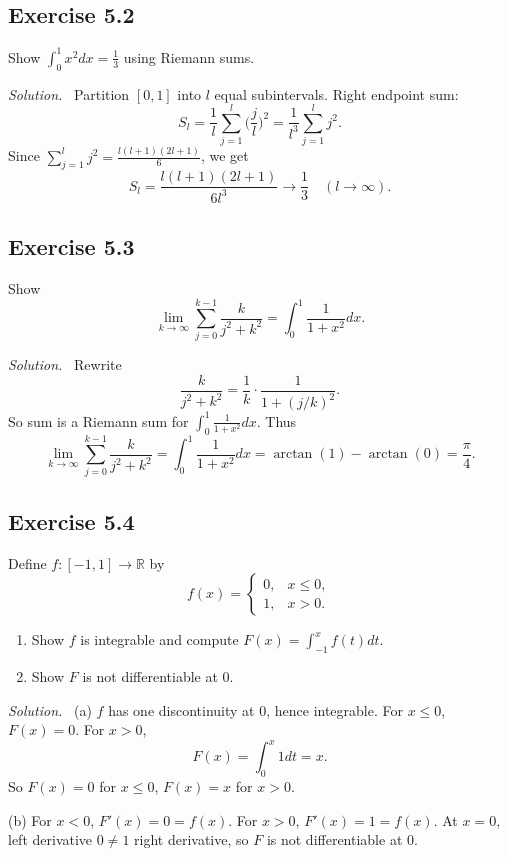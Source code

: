 \documentclass[11pt,a4paper]{article}
\newenvironment{solution}{\par\noindent\textit{Solution.}\ }{\par\vspace{0.5em}}
\begin{document}
\subsection*{Exercise 5.2}
Show $\int_0^1 x^2dx=\tfrac13$ using Riemann sums.

\begin{solution}
	Partition $[0,1]$ into $l$ equal subintervals. Right endpoint sum:
	\[
	S_l=\frac{1}{l}\sum_{j=1}^l \Big(\frac{j}{l}\Big)^2=\frac{1}{l^3}\sum_{j=1}^l j^2.
	\]
	Since $\sum_{j=1}^l j^2=\tfrac{l(l+1)(2l+1)}{6}$, we get
	\[
	S_l=\frac{l(l+1)(2l+1)}{6l^3}\to\frac13 \quad (l\to\infty).
	\]
\end{solution}


\subsection*{Exercise 5.3}
Show
\[
\lim_{k\to\infty}\sum_{j=0}^{k-1}\frac{k}{j^2+k^2}=\int_0^1\frac{1}{1+x^2}dx.
\]

\begin{solution}
	Rewrite
	\[
	\frac{k}{j^2+k^2}=\frac{1}{k}\cdot \frac{1}{1+(j/k)^2}.
	\]
	So sum is a Riemann sum for $\int_0^1 \frac{1}{1+x^2}dx$. Thus
	\[
	\lim_{k\to\infty}\sum_{j=0}^{k-1}\frac{k}{j^2+k^2}=\int_0^1\frac{1}{1+x^2}dx=\arctan(1)-\arctan(0)=\frac{\pi}{4}.
	\]
\end{solution}


\subsection*{Exercise 5.4}
Define $f:[-1,1]\to\mathbb{R}$ by
\[
f(x)=\begin{cases}
	0,& x\leq 0,\\
	1,& x>0.
\end{cases}
\]
\begin{enumerate}[label=\alph*)]
	\item Show $f$ is integrable and compute $F(x)=\int_{-1}^x f(t)dt$.
	\item Show $F$ is not differentiable at $0$.
\end{enumerate}

\begin{solution}
	(a) $f$ has one discontinuity at $0$, hence integrable. For $x\leq 0$, $F(x)=0$. For $x>0$,
	\[
	F(x)=\int_0^x 1dt=x.
	\]
	So $F(x)=0$ for $x\leq 0$, $F(x)=x$ for $x>0$.
	
	(b) For $x<0$, $F'(x)=0=f(x)$. For $x>0$, $F'(x)=1=f(x)$. At $x=0$, left derivative $0\neq 1$ right derivative, so $F$ is not differentiable at $0$.
\end{solution}
\end{document}
